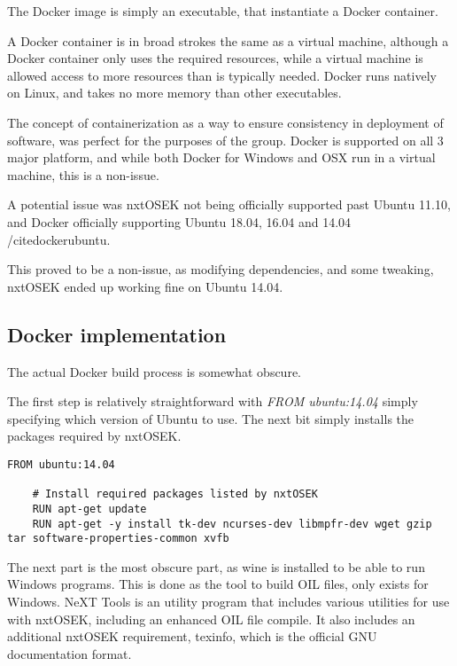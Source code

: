 The Docker image is simply an executable, that instantiate a Docker container.

A Docker container is in broad strokes the same as a virtual machine, although a Docker container only uses the required resources, while a virtual machine is allowed access to more resources than is typically needed.
Docker runs natively on Linux, and takes no more memory than other executables.

The concept of containerization as a way to ensure consistency in deployment of software, was perfect for the purposes of the group.
Docker is supported on all 3 major platform, and while both Docker for Windows and OSX run in a virtual machine, this is a non-issue.

A potential issue was nxtOSEK not being officially supported past Ubuntu 11.10, and Docker officially supporting Ubuntu 18.04, 16.04 and 14.04 /cite{dockerubuntu}.

This proved to be a non-issue, as modifying dependencies, and some tweaking, nxtOSEK ended up working fine on Ubuntu 14.04.

\subsection{Docker implementation}\label{subsec:dockerimplementation}
The actual Docker build process is somewhat obscure.

The first step is relatively straightforward with \textit{FROM ubuntu:14.04} simply specifying which version of Ubuntu to use.
The next bit simply installs the packages required by nxtOSEK.
\begin{lstlisting}[language=docker,label={lst:dockerimplementation1},caption={Version definition and installation of packages required by nxtOSEK}]
    FROM ubuntu:14.04

    # Install required packages listed by nxtOSEK
    RUN apt-get update
    RUN apt-get -y install tk-dev ncurses-dev libmpfr-dev wget gzip tar software-properties-common xvfb
\end{lstlisting} 

The next part is the most obscure part, as wine is installed to be able to run Windows programs.
This is done as the tool to build OIL files, only exists for Windows.
NeXT Tools is an utility program that includes various utilities for use with nxtOSEK, including an enhanced OIL file compile\cite{nxttool}.
It also includes an additional nxtOSEK requirement, texinfo, which is the official GNU documentation format\cite{texinfo}.


